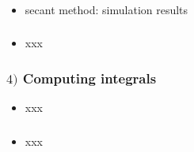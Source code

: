 \documentclass[english,14pt]{beamer}
\begin{document}

\begin{frame}[fragile]

\frametitle{}

\begin{itemize}
	\item secant method: simulation results
\end{itemize}

\end{frame}


\begin{frame}[fragile]

\frametitle{}

\begin{itemize}
	\item xxx
\end{itemize}

\end{frame}


\begin{frame}[fragile]

\frametitle{$4)$ Computing integrals}

\begin{itemize}
	\item xxx
\end{itemize}

\end{frame}


\begin{frame}[fragile]

\frametitle{}

\begin{itemize}
	\item xxx
\end{itemize}

\end{frame}

\end{document}
